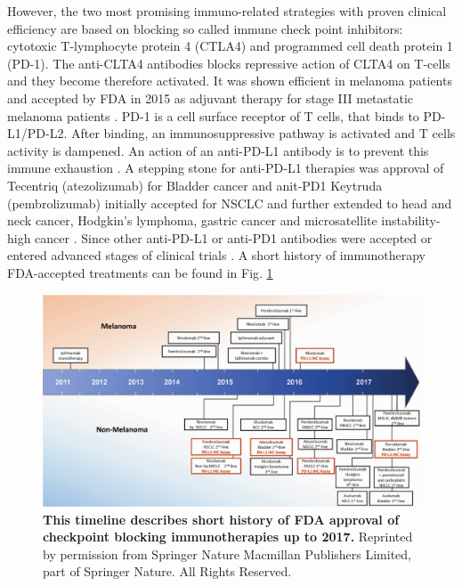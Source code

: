 \documentclass[12pt,]{book}
\theoremstyle{definition}
\theoremstyle{definition}
\theoremstyle{definition}
\theoremstyle{remark}
\begin{document}
However, the two most promising immuno-related strategies with proven
clinical efficiency are based on blocking so called immune check point
inhibitors: cytotoxic T-lymphocyte protein 4 (CTLA4) and programmed cell
death protein 1 (PD-1). The anti-CLTA4 antibodies blocks repressive
action of CLTA4 on T-cells and they become therefore activated. It was
shown efficient in melanoma patients and accepted by FDA in 2015 as
adjuvant therapy for stage III metastatic melanoma patients
\citep{FDACTLA4}. PD-1 is a cell surface receptor of T cells, that binds
to PD-L1/PD-L2. After binding, an immunosuppressive pathway is activated
and T cells activity is dampened. An action of an anti-PD-L1 antibody is
to prevent this immune exhaustion \citep{Chen2017}. A stepping stone for
anti-PD-L1 therapies was approval of Tecentriq (atezolizumab) for
Bladder cancer \citep{FDAPDL1Bladder} and anit-PD1 Keytruda
(pembrolizumab) initially accepted for NSCLC and further extended to
head and neck cancer, Hodgkin's lymphoma, gastric cancer and
microsatellite instability-high cancer \citep{FDAPDL1NSCLC}. Since other
anti-PD-L1 or anti-PD1 antibodies were accepted or entered advanced
stages of clinical trials \citep{Wolchok2015}. A short history of
immunotherapy FDA-accepted treatments can be found in Fig.
\ref{fig:timeline-immunotherapies}

\begin{figure}

{\centering \includegraphics[width=1\linewidth]{figures-ext/02-timeline-immunotherapies} 

}

\caption[This timeline describes short history of FDA approval of checkpoint blocking immunotherapies up to 2017.]{\textbf{This timeline describes
short history of FDA approval of checkpoint blocking immunotherapies up
to 2017.} Reprinted by permission from Springer Nature
\citep{Taube2017a} Macmillan Publishers Limited, part of Springer
Nature. All Rights Reserved.}\label{fig:timeline-immunotherapies}
\end{figure}
\end{document}
